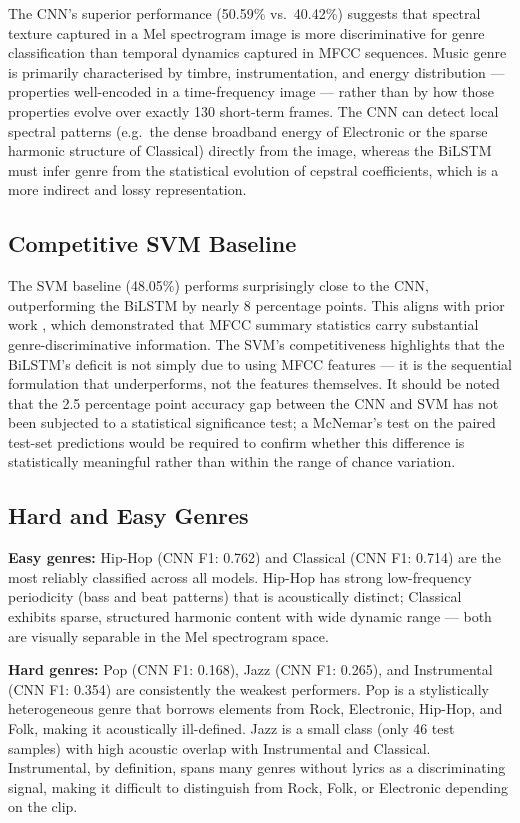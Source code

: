 \documentclass[12pt, a4paper]{article}
\begin{document}
The CNN's superior performance (50.59\% vs.\ 40.42\%) suggests that spectral texture
captured in a Mel spectrogram image is more discriminative for genre classification than
temporal dynamics captured in MFCC sequences. Music genre is primarily characterised by
timbre, instrumentation, and energy distribution --- properties well-encoded in a
time-frequency image --- rather than by how those properties evolve over exactly 130
short-term frames. The CNN can detect local spectral patterns (e.g.\ the dense
broadband energy of Electronic or the sparse harmonic structure of Classical) directly
from the image, whereas the BiLSTM must infer genre from the statistical evolution of
cepstral coefficients, which is a more indirect and lossy representation.

\subsection{Competitive SVM Baseline}

The SVM baseline (48.05\%) performs surprisingly close to the CNN, outperforming the
BiLSTM by nearly 8 percentage points. This aligns with prior work \citep{tzanetakis2002musical},
which demonstrated that MFCC summary statistics carry substantial genre-discriminative
information. The SVM's competitiveness highlights that the BiLSTM's deficit is not
simply due to using MFCC features --- it is the sequential formulation that underperforms,
not the features themselves. It should be noted that the 2.5 percentage point accuracy
gap between the CNN and SVM has not been subjected to a statistical significance test;
a McNemar's test on the paired test-set predictions would be required to confirm whether
this difference is statistically meaningful rather than within the range of chance variation.

\subsection{Hard and Easy Genres}

\textbf{Easy genres:} Hip-Hop (CNN F1: 0.762) and Classical (CNN F1: 0.714) are the
most reliably classified across all models. Hip-Hop has strong low-frequency
periodicity (bass and beat patterns) that is acoustically distinct; Classical exhibits
sparse, structured harmonic content with wide dynamic range --- both are visually
separable in the Mel spectrogram space.

\textbf{Hard genres:} Pop (CNN F1: 0.168), Jazz (CNN F1: 0.265), and Instrumental
(CNN F1: 0.354) are consistently the weakest performers. Pop is a stylistically
heterogeneous genre that borrows elements from Rock, Electronic, Hip-Hop, and Folk,
making it acoustically ill-defined. Jazz is a small class (only 46 test samples) with
high acoustic overlap with Instrumental and Classical. Instrumental, by definition,
spans many genres without lyrics as a discriminating signal, making it difficult to
distinguish from Rock, Folk, or Electronic depending on the clip.
\end{document}
